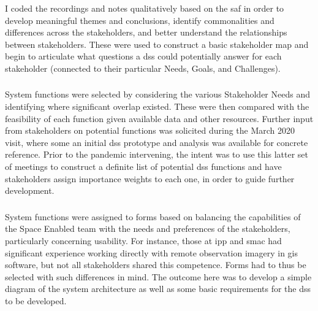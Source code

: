 I coded the recordings and notes qualitatively based on the \ac{saf} in order to develop meaningful themes and conclusions, identify commonalities and differences across the stakeholders, and better understand the relationships between stakeholders. These were used to construct a basic stakeholder map and begin to articulate what questions a \ac{dss} could potentially answer for each stakeholder (connected to their particular Needs, Goals, and Challenges). 

\subsubsection{}

System functions were selected by considering the various Stakeholder Needs and identifying where significant overlap existed. These were then compared with the feasibility of each function given available data and other resources. Further input from stakeholders on potential functions was solicited during the March 2020 visit, where some an initial \ac{dss} prototype and analysis was available for concrete reference. Prior to the pandemic intervening, the intent was to use this latter set of meetings to construct a definite list of potential \ac{dss} functions and have stakeholders assign importance weights to each one, in order to guide further development.

\subsubsection{}

System functions were assigned to forms based on balancing the capabilities of the Space Enabled team with the needs and preferences of the stakeholders, particularly concerning usability. For instance, those at \ac{ipp} and \ac{smac} had significant experience working directly with remote observation imagery in \ac{gis} software, but not all stakeholders shared this competence. Forms had to thus be selected with such differences in mind. The outcome here was to develop a simple diagram of the system architecture as well as some basic requirements for the \ac{dss} to be developed.


\subsubsection{} \label{sec:rio-monitor-method}

